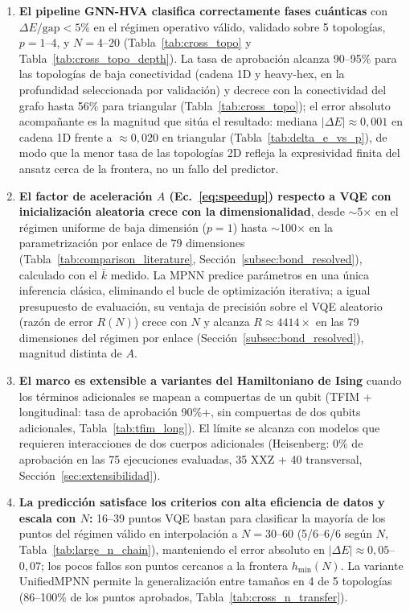 \documentclass[11pt,a4paper,spanish]{book}
\begin{document}
\begin{enumerate}
    \item \textbf{El pipeline GNN-HVA clasifica correctamente fases cuánticas} con $\Delta E/\text{gap} < 5\%$ en el régimen operativo válido, validado sobre 5 topologías, $p = 1$--$4$, y $N = 4$--$20$ (Tabla~\ref{tab:cross_topo} y Tabla~\ref{tab:cross_topo_depth}). La tasa de aprobación alcanza 90--95\% para las topologías de baja conectividad (cadena 1D y heavy-hex, en la profundidad seleccionada por validación) y decrece con la conectividad del grafo hasta 56\% para triangular (Tabla~\ref{tab:cross_topo}); el error absoluto acompañante es la magnitud que sitúa el resultado: mediana $|\Delta E| \approx 0,001$ en cadena 1D frente a $\approx 0,020$ en triangular (Tabla~\ref{tab:delta_e_vs_p}), de modo que la menor tasa de las topologías 2D refleja la expresividad finita del ansatz cerca de la frontera, no un fallo del predictor.

    \item \textbf{El factor de aceleración $A$ (Ec.~\ref{eq:speedup}) respecto a VQE con inicialización aleatoria crece con la dimensionalidad}, desde $\sim$5$\times$ en el régimen uniforme de baja dimensión ($p = 1$) hasta $\sim$100$\times$ en la parametrización por enlace de 79 dimensiones (Tabla~\ref{tab:comparison_literature}, Sección~\ref{subsec:bond_resolved}), calculado con el $\bar{k}$ medido. La MPNN predice parámetros en una única inferencia clásica, eliminando el bucle de optimización iterativa; a igual presupuesto de evaluación, su ventaja de precisión sobre el VQE aleatorio (razón de error $R(N)$) crece con $N$ y alcanza $R \approx 4414\times$ en las 79 dimensiones del régimen por enlace (Sección~\ref{subsec:bond_resolved}), magnitud distinta de $A$.

    \item \textbf{El marco es extensible a variantes del Hamiltoniano de Ising} cuando los términos adicionales se mapean a compuertas de un qubit (TFIM + longitudinal: tasa de aprobación 90\%+, sin compuertas de dos qubits adicionales, Tabla~\ref{tab:tfim_long}). El límite se alcanza con modelos que requieren interacciones de dos cuerpos adicionales (Heisenberg: 0\% de aprobación en las 75 ejecuciones evaluadas, 35 XXZ + 40 transversal, Sección~\ref{sec:extensibilidad}).

    \item \textbf{La predicción satisface los criterios con alta eficiencia de datos y escala con $N$:} 16--39 puntos VQE bastan para clasificar la mayoría de los puntos del régimen válido en interpolación a $N = 30$--$60$ (5/6--6/6 según $N$, Tabla~\ref{tab:large_n_chain}), manteniendo el error absoluto en $|\Delta E| \approx 0,05$--$0,07$; los pocos fallos son puntos cercanos a la frontera $h_{\min}(N)$. La variante UnifiedMPNN permite la generalización entre tamaños en 4 de 5 topologías (86--100\% de los puntos aprobados, Tabla~\ref{tab:cross_n_transfer}).


\end{enumerate}
\end{document}
